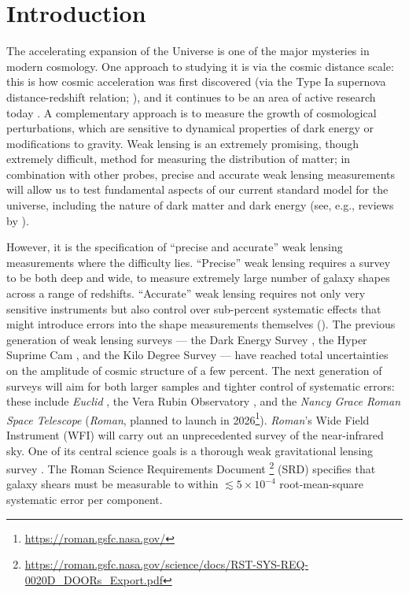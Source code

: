 \documentclass[]{pasj01}
\newcommand{\Katherine}[1]{{\textcolor{ForestGreen}{\bfseries{[#1]}}}}
\newcommand{\Chris}[1]{{\textcolor{red}{\bfseries{[#1]}}}}
\begin{document}
\section{Introduction}


The accelerating expansion of the Universe is one of the major mysteries in modern cosmology. One approach to studying it is via the cosmic distance scale: this is how cosmic acceleration was first discovered (via the Type Ia supernova distance-redshift relation; \cite{Riess1998, Perlmutter1999}), and it continues to be an area of active research today \citep{Scolnic2022, DES2024, Rubin2025, DESI2025a, DESI2025b}. A complementary approach is to measure the growth of cosmological perturbations, which are sensitive to dynamical properties of dark energy or modifications to gravity. Weak lensing is an extremely promising, though extremely difficult, method for measuring the distribution of matter; in combination with other probes, precise and accurate weak lensing measurements will allow us to test fundamental aspects of our current standard model for the universe, including the nature of dark matter and dark energy (see, e.g., reviews by \cite{Hoekstra2008, Weinberg2013, Bartelmann2017, Prat2025}).

However, it is the specification of ``precise and accurate'' weak lensing measurements where the difficulty lies. ``Precise'' weak lensing requires a survey to be both deep and wide, to measure extremely large number of galaxy shapes across a range of redshifts. ``Accurate'' weak lensing requires not only very sensitive instruments but also control over sub-percent systematic effects that might introduce errors into the shape measurements themselves (\cite{Mandelbaum2018}). The previous generation of weak lensing surveys --- the Dark Energy Survey \cite{DES2022}, the Hyper Suprime Cam \cite{Miyatake2023, Sugiyama2023}, and the Kilo Degree Survey \cite{Wright2025} --- have reached total uncertainties on the amplitude of cosmic structure of a few percent. The next generation of surveys will aim for both larger samples and tighter control of systematic errors: these include \textit{Euclid} \citep{Euclid2025}, the Vera Rubin Observatory \citep{Ivezic2019}, and the \textit{Nancy Grace Roman Space Telescope} (\textit{Roman}, planned to launch in 2026\footnote{\url{https://roman.gsfc.nasa.gov/}}). {\slshape Roman}'s Wide Field Instrument (WFI) will carry out an unprecedented survey of the near-infrared sky. One of its central science goals is a thorough weak gravitational lensing survey \citep{Spergel2015, Akeson2019}. The Roman Science Requirements Document \footnote{\url{https://roman.gsfc.nasa.gov/science/docs/RST-SYS-REQ-0020D_DOORs_Export.pdf}} (SRD) specifies that galaxy shears must be measurable to within $\lesssim 5\times 10^{-4}$ root-mean-square systematic error per component.
\end{document}
